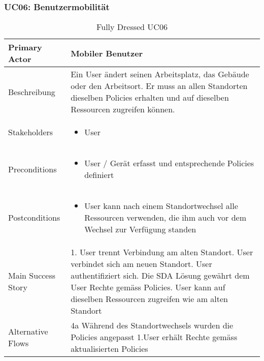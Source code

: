 \subsubsection{UC06: Benutzermobilität}
\begin{table}[H]
	\centering
	\begin{tabularx}{\textwidth}{l | X}
		Primary Actor   & Mobiler Benutzer        \\
		\hline
		Beschreibung   & Ein User ändert seinen Arbeitsplatz, das Gebäude oder den Arbeitsort. Er muss an allen Standorten dieselben Policies erhalten und auf dieselben Ressourcen zugreifen können.  \\ 
		\hline
		Stakeholders       & 
		\begin{itemize}
			\item User
		\end{itemize} \\ 
		Preconditions      &
		\begin{itemize}	
			\item User / Gerät erfasst und entsprechende Policies definiert
		\end{itemize}  \\
		\hline
		Postconditions     & 
		\begin{itemize}	
			\item User kann nach einem Standortwechsel alle Ressourcen verwenden, die ihm auch vor dem Wechsel zur Verfügung standen
		\end{itemize}  \\
		\hline
		Main Success Story & 
		1.  User trennt Verbindung am alten Standort\newline
		2.  User verbindet sich am neuen Standort\newline
		3.  User authentifiziert sich\newline
		4.  Die SDA Lösung gewährt dem User Rechte gemäss Policies\newline
		5.  User kann auf dieselben Ressourcen zugreifen wie am alten Standort\newline
		\\
		\hline
		Alternative Flows  & 
		4a Während des Standortwechsels wurden die Policies angepasst \newline
		\noindent\hspace*{6mm} 1.User erhält Rechte gemäss aktualisierten Policies \newline
	\end{tabularx}
	\caption{Fully Dressed UC06}
	\label{tab:UC06}
\end{table}

